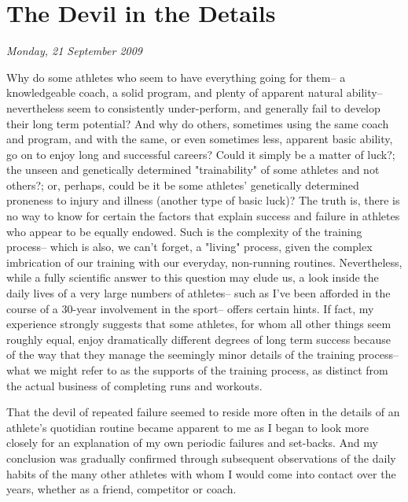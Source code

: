 \chapter{The Devil in the Details}
\textit{Monday, 21 September 2009}
\bigskip

Why do some athletes who seem to have everything going for them-- a knowledgeable coach, a solid program, and plenty of apparent natural ability-- nevertheless seem to consistently under-perform, and generally fail to develop their long term potential? And why do others, sometimes using the same coach and program, and with the same, or even sometimes less, apparent basic ability, go on to enjoy long and successful careers? Could it simply be a matter of luck?; the unseen and genetically determined "trainability" of some athletes and not others?; or, perhaps, could be it be some athletes' genetically determined proneness to injury and illness (another type of basic luck)? The truth is, there is no way to know for certain the factors that explain success and failure in athletes who appear to be equally endowed. Such is the complexity of the training process-- which is also, we can't forget, a "living" process, given the complex imbrication of our training with our everyday, non-running routines. Nevertheless, while a fully scientific answer to this question may elude us, a look inside the daily lives of a very large numbers of athletes-- such as I've been afforded in the course of a 30-year involvement in the sport-- offers certain hints. If fact, my experience strongly suggests that some athletes, for whom all other things seem roughly equal, enjoy dramatically different degrees of long term success because of the way that they manage the seemingly minor details of the training process-- what we might refer to as the supports of the training process, as distinct from the actual business of completing runs and workouts.

That the devil of repeated failure seemed to reside more often in the details of an athlete's quotidian routine became apparent to me as I began to look more closely for an explanation of my own periodic failures and set-backs. And my conclusion was gradually confirmed through subsequent observations of the daily habits of the many other athletes with whom I would come into contact over the years, whether as a friend, competitor or coach.

